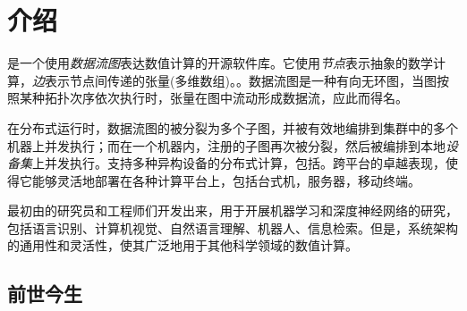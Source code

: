 \begin{savequote}[45mm]
\end{savequote}

\chapter{介绍} 
\label{ch:introduction}

\begin{content}

\tf{}是一个使用\emph{数据流图}表达数值计算的开源软件库。它使用\emph{节点}表示抽象的数学计算，\emph{边}表示节点间传递的张量(多维数组)。。数据流图是一种有向无环图，当图按照某种拓扑次序依次执行时，张量在图中流动形成数据流，\tf{}应此而得名。

在分布式运行时，数据流图的被分裂为多个子图，并被有效地编排到集群中的多个机器上并发执行；而在一个机器内，注册的子图再次被分裂，然后被编排到本地\emph{设备集}上并发执行。\tf{}支持多种异构设备的分布式计算，包括。\tf{}跨平台的卓越表现，使得它能够灵活地部署在各种计算平台上，包括台式机，服务器，移动终端。

\tf{}最初由的研究员和工程师们开发出来，用于开展机器学习和深度神经网络的研究，包括语言识别、计算机视觉、自然语言理解、机器人、信息检索。但是，\tf{}系统架构的通用性和灵活性，使其广泛地用于其他科学领域的数值计算。

\end{content}

\section{前世今生}

